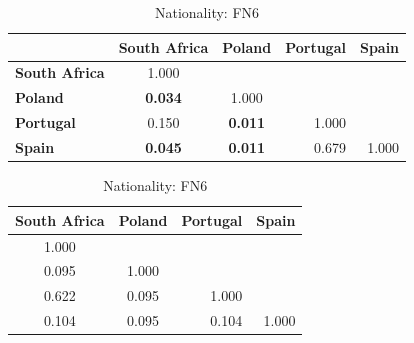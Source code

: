 \begin{table}
    \scriptsize
    \centering
    \setlength\tabcolsep{2pt}
    \begin{minipage}{.49\linewidth}
        \centering
        \begin{tabular}{lcccc}
            \toprule
                                  & \multicolumn{1}{l}{\textbf{South Africa}} & \multicolumn{1}{l}{\textbf{Poland}}    & \textbf{Portugal}         & \textbf{Spain}            \\
            \midrule
            \textbf{South Africa} & 1.000                                     & \multicolumn{1}{l}{}                   &                           &                           \\
            \textbf{Poland}       & \cellcolor[HTML]{EFEFEF}\textbf{0.034}    & 1.000                                  &                           &                           \\
            \textbf{Portugal}     & 0.150                                     & \cellcolor[HTML]{EFEFEF}\textbf{0.011} & \multicolumn{1}{r}{1.000} &                           \\
            \textbf{Spain}        & \cellcolor[HTML]{EFEFEF}\textbf{0.045}    & \cellcolor[HTML]{EFEFEF}\textbf{0.011} & \multicolumn{1}{r}{0.679} & \multicolumn{1}{r}{1.000} \\
            \bottomrule
        \end{tabular}
        \caption{Nationality: FN5}
    \end{minipage}
    \begin{minipage}{.49\linewidth}
        \centering
        \begin{tabular}{cccc}
            \toprule
            \multicolumn{1}{l}{\textbf{South Africa}} & \multicolumn{1}{l}{\textbf{Poland}} & \textbf{Portugal}         & \textbf{Spain}            \\
            \midrule
            1.000                                     & \multicolumn{1}{l}{}                &                           &                           \\
            0.095                                     & 1.000                               &                           &                           \\
            0.622                                     & 0.095                               & \multicolumn{1}{r}{1.000} &                           \\
            0.104                                     & 0.095                               & \multicolumn{1}{r}{0.104} & \multicolumn{1}{r}{1.000} \\
            \bottomrule
        \end{tabular}
        \caption{Nationality: FN6}
    \end{minipage}
\end{table}

